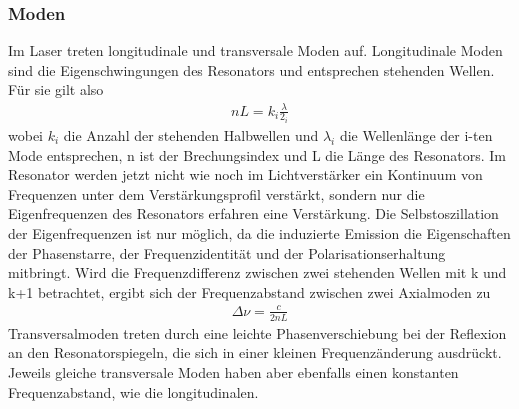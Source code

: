 \documentclass[a4paper,twoside,final]{article}
\begin{document}
\subsubsection{Moden}
Im Laser treten longitudinale und transversale Moden  auf. Longitudinale Moden sind die Eigenschwingungen des Resonators und entsprechen stehenden Wellen. Für sie gilt also
\begin{align}
  n L = k_i \frac{\lambda}{2_i}
\end{align}
wobei $k_i$ die Anzahl der stehenden Halbwellen und $\lambda_i$ die Wellenlänge der i-ten Mode entsprechen, n ist der Brechungsindex und L die Länge des Resonators. Im Resonator werden jetzt nicht wie noch im Lichtverstärker ein Kontinuum von Frequenzen unter dem Verstärkungsprofil verstärkt, sondern nur die Eigenfrequenzen des Resonators erfahren eine Verstärkung. Die Selbstoszillation der Eigenfrequenzen ist nur möglich, da die induzierte Emission die Eigenschaften der Phasenstarre, der Frequenzidentität und der Polarisationserhaltung mitbringt. Wird die Frequenzdifferenz zwischen zwei stehenden Wellen mit k und k+1 betrachtet, ergibt sich der Frequenzabstand zwischen zwei Axialmoden zu
\begin{align}
  \Delta \nu = \frac{c}{2nL}
\end{align}
Transversalmoden treten durch eine leichte Phasenverschiebung bei der Reflexion an den Resonatorspiegeln, die sich in einer kleinen Frequenzänderung ausdrückt. Jeweils gleiche transversale Moden haben aber ebenfalls einen konstanten Frequenzabstand, wie die longitudinalen.
\end{document}
